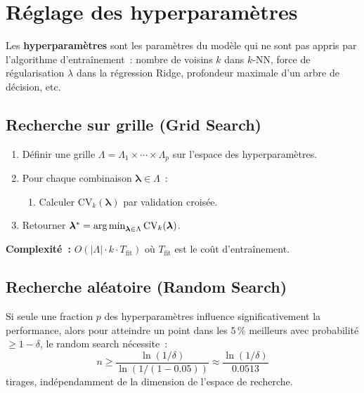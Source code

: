 \section{R\'eglage des hyperparam\`etres}
\label{sec:hyperparameters}

\begin{definition}
Les \textbf{hyperparam\`etres} sont les param\`etres du mod\`ele qui ne
sont pas appris par l'algorithme d'entra\^inement~: nombre de voisins $k$
dans $k$-NN, force de r\'egularisation $\lambda$ dans la r\'egression Ridge,
profondeur maximale d'un arbre de d\'ecision, etc.
\end{definition}

\subsection{Recherche sur grille (Grid Search)}

\begin{algorithme}[title=\textbf{Grid Search avec validation crois\'ee}]
\begin{enumerate}
  \item D\'efinir une grille $\Lambda = \Lambda_1 \times \cdots \times \Lambda_p$
    sur l'espace des hyperparam\`etres.
  \item Pour chaque combinaison $\bm{\lambda} \in \Lambda$~:
    \begin{enumerate}
      \item Calculer $\text{CV}_k(\bm{\lambda})$ par validation crois\'ee.
    \end{enumerate}
  \item Retourner $\bm{\lambda}^* = \operatorname*{arg\,min}_{\bm{\lambda} \in \Lambda}
    \text{CV}_k(\bm{\lambda})$.
\end{enumerate}
\textbf{Complexit\'e~:} $O(|\Lambda| \cdot k \cdot T_{\text{fit}})$ o\`u
$T_{\text{fit}}$ est le co\^ut d'entra\^inement.
\end{algorithme}

\subsection{Recherche al\'eatoire (Random Search)}

\begin{theoreme}
\label{thm:random-search}
Si seule une fraction $p$ des hyperparam\`etres influence significativement
la performance, alors pour atteindre un point dans les $5\,\%$ meilleurs
avec probabilit\'e $\geq 1 - \delta$, le random search n\'ecessite~:
\begin{equation}
  n \geq \frac{\ln(1/\delta)}{\ln(1/(1-0.05))} \approx
  \frac{\ln(1/\delta)}{0.0513}
\end{equation}
tirages, ind\'ependamment de la dimension de l'espace de recherche.
\end{theoreme}

